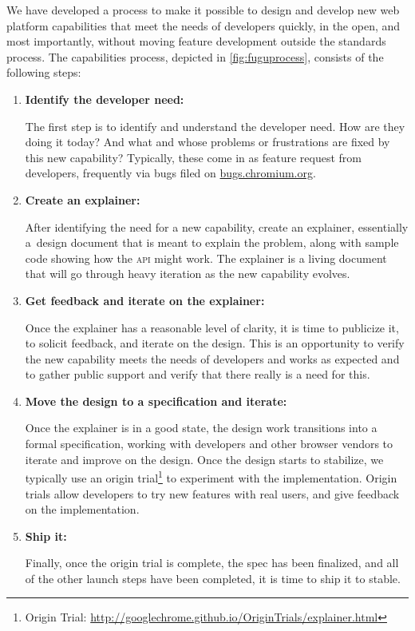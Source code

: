 \documentclass[sigconf]{acmart}
\begin{document}
We have developed a process to make it possible to design and develop
new web platform capabilities that meet the needs of developers quickly,
in the open, and most importantly, without moving feature development outside the standards process.
The capabilities process, depicted in \autoref{fig:fuguprocess}, consists of the following steps:

\begin{enumerate}  
  \item \textbf{Identify the developer need:}
  
  The first step is to identify and understand the developer need.
  How are they doing it today? And what and whose problems or frustrations
  are fixed by this new capability? Typically, these come in as feature request
  from developers, frequently via bugs filed on \url{bugs.chromium.org}.

  \item \textbf{Create an explainer:}

  After identifying the need for a new capability, create an explainer,
  essentially a~design document that is meant to explain the problem,
  along with sample code showing how the \textsc{api} might work.
  The explainer is a living document that will go through heavy iteration
  as the new capability evolves.

  \item \textbf{Get feedback and iterate on the explainer:}

  Once the explainer has a reasonable level of clarity,
  it is time to publicize it, to solicit feedback, and iterate on the design.
  This is an opportunity to verify the new capability meets the needs of developers
  and works as expected and to gather public support and verify
  that there really is a need for this.

  \item \textbf{Move the design to a specification and iterate:}
  
  Once the explainer is in a good state,
  the design work transitions into a formal specification,
  working with developers and other browser vendors to iterate and improve on the design.
  Once the design starts to stabilize, we typically use an
  origin trial\footnote{Origin Trial: \url{http://googlechrome.github.io/OriginTrials/explainer.html}}
  to experiment with the implementation.
  Origin trials allow developers to try new features with real users,
  and give feedback on the implementation.

  \item \textbf{Ship it:}

  Finally, once the origin trial is complete, the spec has been finalized,
  and all of the other launch steps have been completed, it is time to ship it to stable.  
\end{enumerate}
\end{document}
